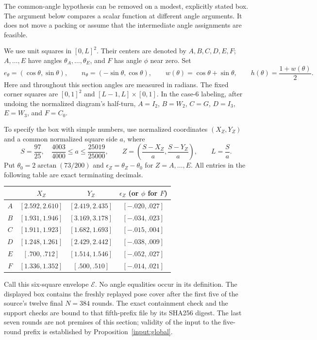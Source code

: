 \documentclass[11pt]{article}
\begin{document}
The common-angle hypothesis can be removed on a modest, explicitly stated
box. The argument below compares a scalar function at different angle
arguments. It does not move a packing or assume that the intermediate
angle assignments are feasible.

We use unit squares in $[0,L]^2$. Their centers are denoted by
$A,B,C,D,E,F$; $A,\ldots,E$ have angles
$\theta_A,\ldots,\theta_E$, and $F$ has angle $\phi$ near zero. Set
\[
 e_\theta=(\cos\theta,\sin\theta),\qquad
 n_\theta=(-\sin\theta,\cos\theta),\qquad
 w(\theta)=\cos\theta+\sin\theta,\qquad
 h(\theta)=\frac{1+w(\theta)}2.
\]
Here and throughout this section angles are measured in radians.
The fixed corner squares are $[0,1]^2$ and $[L-1,L]\times[0,1]$.
In the case-6 labeling, after undoing the normalized diagram's half-turn,
$A=I_2$, $B=W_2$, $C=G$, $D=I_3$, $E=W_3$, and $F=C_0$.

To specify the box with simple numbers, use normalized coordinates
$(X_Z,Y_Z)$ and a common normalized square side $a$, where
\[
 S=\frac{97}{25},\quad
 \frac{4003}{4000}\le a\le\frac{25019}{25000},\qquad
 Z=\left(\frac{S-X_Z}{a},\frac{S-Y_Z}{a}\right),\qquad L=\frac Sa.
\]
Put $\theta_0=2\arctan(73/200)$ and
$\epsilon_Z=\theta_Z-\theta_0$ for $Z=A,\ldots,E$.
All entries in the following table are exact terminating decimals.
\begin{center}
\begin{tabular}{c|c|c|c}
 & $X_Z$ & $Y_Z$ & $\epsilon_Z$ (or $\phi$ for $F$)\\ \hline
$A$&$[2.592,2.610]$&$[2.419,2.435]$&$[-.020,.027]$\\
$B$&$[1.931,1.946]$&$[3.169,3.178]$&$[-.034,.023]$\\
$C$&$[1.911,1.923]$&$[1.682,1.693]$&$[-.015,.004]$\\
$D$&$[1.248,1.261]$&$[2.429,2.442]$&$[-.038,.009]$\\
$E$&$[.700,.712]$&$[1.514,1.546]$&$[-.052,.027]$\\
$F$&$[1.336,1.352]$&$[.500,.510]$&$[-.014,.021]$
\end{tabular}
\end{center}
Call this six-square envelope $\mathcal E$. No angle equalities occur in
its definition.
The displayed box contains the freshly replayed pose cover after the first
five of the source's twelve final $N=384$ rounds. The exact containment
check and the support checks are bound to that fifth-prefix file by its
SHA256 digest. The last seven rounds are not premises of this section;
validity of the input to the five-round prefix is established by
Proposition~\ref{input:global}.
\end{document}
